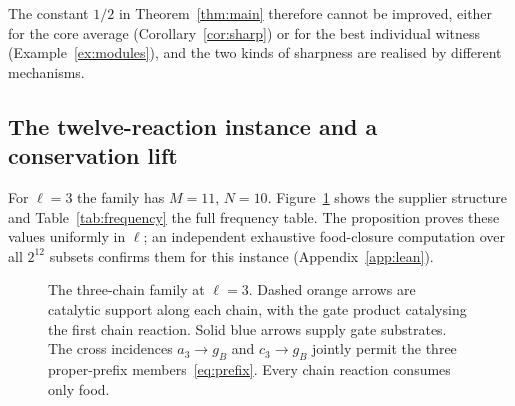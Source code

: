 \documentclass[11pt,a4paper]{article}
\theoremstyle{plain}
\theoremstyle{definition}
\theoremstyle{remark}
\begin{document}
The constant $1/2$ in Theorem~\ref{thm:main} therefore cannot be improved, either for the core average (Corollary~\ref{cor:sharp}) or for the best individual witness (Example~\ref{ex:modules}), and the two kinds of sharpness are realised by different mechanisms.

\subsection{The twelve-reaction instance and a conservation lift}\label{sec:twelve}

For $\ell=3$ the family has $M=11$, $N=10$. Figure~\ref{fig:twelve} shows the supplier structure and Table~\ref{tab:frequency} the full frequency table. The proposition proves these values uniformly in $\ell$; an independent exhaustive food-closure computation over all $2^{12}$ subsets confirms them for this instance (Appendix~\ref{app:lean}).

\begin{figure}[htbp]
\centering
{}
\caption{The three-chain family at $\ell=3$. Dashed orange arrows are catalytic support along each chain, with the gate product catalysing the first chain reaction. Solid blue arrows supply gate substrates. The cross incidences $a_3\to g_B$ and $c_3\to g_B$ jointly permit the three proper-prefix members~\eqref{eq:prefix}. Every chain reaction consumes only food.}
\label{fig:twelve}
\end{figure}
\end{document}
